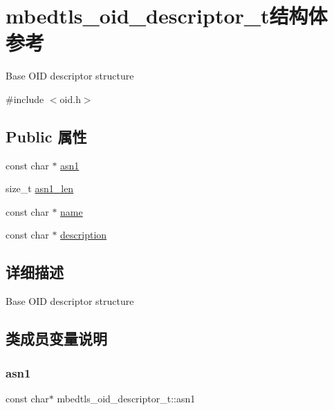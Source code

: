\hypertarget{structmbedtls__oid__descriptor__t}{}\section{mbedtls\+\_\+oid\+\_\+descriptor\+\_\+t结构体 参考}
\label{structmbedtls__oid__descriptor__t}


Base O\+ID descriptor structure  




{\ttfamily \#include $<$oid.\+h$>$}

\subsection*{Public 属性}
\begin{DoxyCompactItemize}
\item 
const char $\ast$ \hyperlink{structmbedtls__oid__descriptor__t_a9a0c9f82eed2f753d0fa0c4727c21ffa}{asn1}
\item 
size\+\_\+t \hyperlink{structmbedtls__oid__descriptor__t_a99525f8a87473843e282f79ee07e5f9f}{asn1\+\_\+len}
\item 
const char $\ast$ \hyperlink{structmbedtls__oid__descriptor__t_a096eb054c65a0735f77c3431097c2aa4}{name}
\item 
const char $\ast$ \hyperlink{structmbedtls__oid__descriptor__t_a5b447674c65045cf4f855bd1c728f109}{description}
\end{DoxyCompactItemize}


\subsection{详细描述}
Base O\+ID descriptor structure 

\subsection{类成员变量说明}
\mbox{\label{structmbedtls__oid__descriptor__t_a9a0c9f82eed2f753d0fa0c4727c21ffa}} 
\subsubsection{\texorpdfstring{asn1}{asn1}}
{\footnotesize\ttfamily const char$\ast$ mbedtls\+\_\+oid\+\_\+descriptor\+\_\+t\+::asn1}

